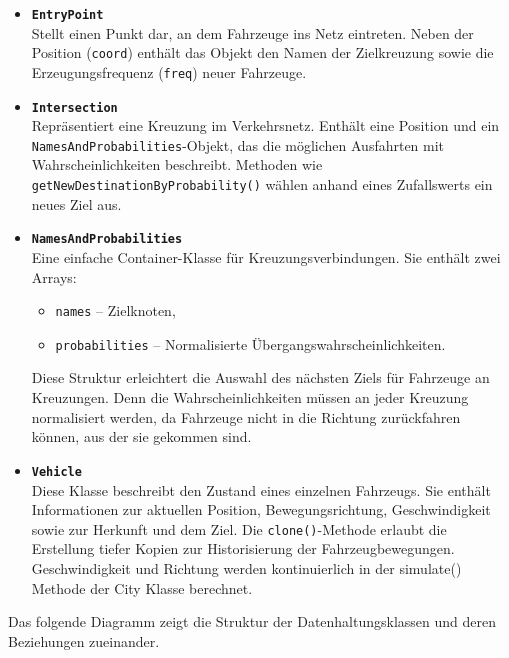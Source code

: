 \begin{itemize}
  \item \textbf{\texttt{EntryPoint}}\\
  Stellt einen Punkt dar,
  an dem Fahrzeuge ins Netz eintreten.
  Neben der Position (\texttt{coord}) enthält das Objekt den Namen der Zielkreuzung sowie die Erzeugungsfrequenz (\texttt{freq}) neuer Fahrzeuge.

  \item \textbf{\texttt{Intersection}}\\
  Repräsentiert eine Kreuzung im Verkehrsnetz.
  Enthält eine Position und ein \texttt{NamesAndProbabilities}-Objekt,
  das die möglichen Ausfahrten mit Wahrscheinlichkeiten beschreibt.
  Methoden wie \texttt{getNewDestinationByProbability()} wählen anhand eines Zufallswerts ein neues Ziel aus.

  \item \textbf{\texttt{NamesAndProbabilities}}\\
  Eine einfache Container-Klasse für Kreuzungsverbindungen. Sie enthält zwei Arrays:
  \begin{itemize}
    \item \texttt{names} -- Zielknoten,
    \item \texttt{probabilities} -- Normalisierte Übergangswahrscheinlichkeiten.
  \end{itemize}
  Diese Struktur erleichtert die Auswahl des nächsten Ziels für Fahrzeuge an Kreuzungen.
  Denn die Wahrscheinlichkeiten müssen an jeder Kreuzung normalisiert werden, da Fahrzeuge nicht in die Richtung zurückfahren können, aus der sie gekommen sind.

  \item \textbf{\texttt{Vehicle}}\\
  Diese Klasse beschreibt den Zustand eines einzelnen Fahrzeugs.
  Sie enthält Informationen zur aktuellen Position, Bewegungsrichtung, Geschwindigkeit sowie zur Herkunft und dem Ziel.
  Die \texttt{clone()}-Methode erlaubt die Erstellung tiefer Kopien zur Historisierung der Fahrzeugbewegungen.
  Geschwindigkeit und Richtung werden kontinuierlich in der simulate() Methode der City Klasse berechnet.
\end{itemize}

Das folgende Diagramm zeigt die Struktur der Datenhaltungsklassen und deren Beziehungen zueinander.
\begin{figure}[h!]
    \centering
\end{figure}

